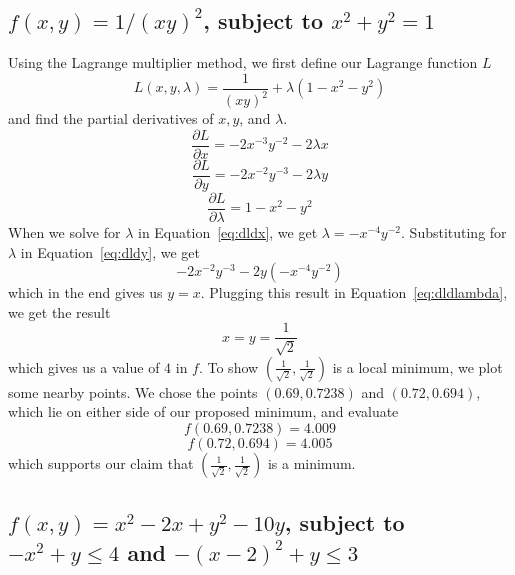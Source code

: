 \documentclass[11pt]{scrartcl}
\begin{document}
\subsection{$f(x,y) = 1/(xy)^2$, subject to $x^2 + y^2 = 1$}
Using the Lagrange multiplier method, we first define our Lagrange function $L$
\[L(x, y, \lambda) = \frac{1}{(xy)^2} +\lambda(1-x^2-y^2)\]
and find the partial derivatives of $x, y$, and $\lambda$.
\begin{equation}
	\label{eq:dldx}
	\frac{\partial L}{\partial x} = -2x^{-3}y^{-2} -2\lambda x
\end{equation}
\begin{equation}
	\label{eq:dldy}
	\frac{\partial L}{\partial y} = -2x^{-2}y^{-3}-2\lambda y
\end{equation}
\begin{equation}
	\label{eq:dldlambda}
	\frac{\partial L }{\partial \lambda} = 1-x^2-y^2
\end{equation}
When we solve for $\lambda$ in Equation~\ref{eq:dldx}, we get 
$\lambda = -x^{-4}y^{-2}$.
Substituting for $\lambda$ in Equation~\ref{eq:dldy}, we get
\[-2x^{-2}y^{-3}-2y(-x^{-4}y^{-2})\]
which in the end gives us $y=x$.
Plugging this result in Equation~\ref{eq:dldlambda}, we get the result
\[x = y = \frac{1}{\sqrt{2}}\]
which gives us a value of $4$ in $f$.
To show $(\frac{1}{\sqrt{2}},\frac{1}{\sqrt{2}})$ is a local minimum, we 
plot some nearby points.
We chose the points $(0.69, 0.7238)$ and $(0.72, 0.694)$, which lie on either
side of our proposed minimum, and evaluate
\[f(0.69, 0.7238) = 4.009\]
\[f(0.72, 0.694) = 4.005\]
which supports our claim that $(\frac{1}{\sqrt{2}},\frac{1}{\sqrt{2}})$ is a minimum.
\subsection{$f(x,y) = x^2 - 2x + y^2- 10y$, 
subject to $-x^2 + y \leq 4$ and $-(x-2)^2 + y \leq 3$}
\end{document}
